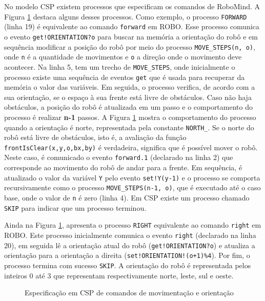 No modelo CSP existem processos que especificam os comandos de RoboMind. A Figura \ref{fig:model2} destaca alguns desses processos. Como exemplo, o processo \texttt{FORWARD} (linha 19) é equivalente ao comando \texttt{forward} em ROBO. Esse processo comunica o evento \texttt{get!ORIENTATION?o} para buscar na memória a orientação do robô e em sequência modificar a posição do robô por meio do processo \texttt{MOVE\_STEPS(n, o)}, onde \texttt{n} é a quantidade de movimentos e \texttt{o} a direção onde o movimento deve acontecer. Na linha 5, tem um trecho de \texttt{MOVE\_STEPS}, onde inicialmente o processo existe uma sequência de eventos \texttt{get} que é usada para recuperar da memória o valor das variáveis. Em seguida, o processo verifica, de acordo com a sua orientação, se o espaço à sua frente está livre de obstáculos. Caso não haja obstáculos, a posição do robô é atualizada em um passo e o comportamento do processo é realizar \textbf{n-1} passos. A Figura \ref{fig:model2} mostra o comportamento do processo quando a orientação é norte, representada pela constante \texttt{NORTH\_}. Se o norte do robô está livre de obstáculos, isto é, a avaliação da função \texttt{frontIsClear(x,y,o,bx,by)} é verdadeira, significa que é possível mover o robô. Neste caso, é comunicado o evento \texttt{forward.1} (declarado na linha 2) que corresponde ao movimento do robô de andar para a frente. Em sequência, é atualizado o valor da variável \texttt{Y} pelo evento \texttt{set!Y(y-1)} e o processo se comporta recursivamente como o processo \texttt{MOVE\_STEPS(n-1, o)}, que é executado até o caso base, onde o valor de \texttt{n} é zero (linha 4). Em CSP existe um processo chamado \texttt{SKIP} para indicar que um processo terminou. 

Ainda na Figura \ref{fig:model2}, apresenta o processo \texttt{RIGHT} equivalente ao comando \texttt{right} em ROBO. Este processo inicialmente comunica o evento \texttt{right} (declarado na linha 20), em seguida lê a orientação atual do robô (\texttt{get!ORIENTATION?o}) e atualiza a orientação para a orientação a direita  (\texttt{set!ORIENTATION!(o+1)\%4}). Por fim, o processo termina com sucesso \texttt{SKIP}. A orientação do robô é representada pelos inteiros 0 até 3 que representam respectivamente norte, leste, sul e oeste. 

\begin{figure}[h]
\caption{Especificação em CSP de comandos de movimentação e orientação}

\label{fig:model2}
\end{figure}

